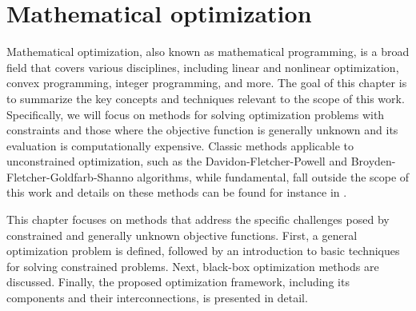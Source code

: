 \chapter{Mathematical optimization}\label{optimization}

Mathematical optimization, also known as mathematical programming, is a broad field that covers various disciplines, including linear and nonlinear optimization, convex programming, integer programming, and more. The goal of this chapter is to summarize the key concepts and techniques relevant to the scope of this work. Specifically, we will focus on methods for solving optimization problems with constraints and those where the objective function is generally unknown and its evaluation is computationally expensive. Classic methods applicable to unconstrained optimization, such as the Davidon-Fletcher-Powell \cite{Fletcher1963} and Broyden-Fletcher-Goldfarb-Shanno \cite{broyden1970} algorithms, while fundamental, fall outside the scope of this work and details on these methods can be found for instance in \cite{Bert}.

This chapter focuses on methods that address the specific challenges posed by constrained and generally unknown objective functions. First, a general optimization problem is defined, followed by an introduction to basic techniques for solving constrained problems. Next, black-box optimization methods are discussed. Finally, the proposed optimization framework, including its components and their interconnections, is presented in detail.







